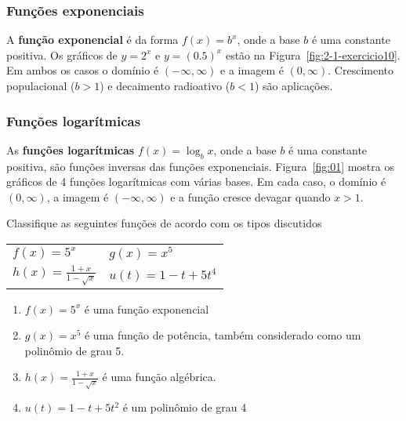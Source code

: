 \subsubsection{Funções exponenciais}

A \textbf{função exponencial} é da forma $f(x)=b^x$, onde a base $b$ é uma constante positiva. Os gráficos de $y=2^x$ e $y=(0.5)^x$ estão na Figura~\ref{fig:2-1-exercicio10}. Em ambos os casos o domínio é $(-\infty, \infty)$ e a imagem é $(0,\infty)$. Crescimento populacional ($b > 1$) e decaimento radioativo ($b < 1$) são aplicações.
\vspace{-0.5cm}\begin{figure}[!ht]
	\centering
	\caption{}\label{fig:exponential-functions}
\end{figure}\vspace{-0.5cm}
\subsubsection{Funções logarítmicas}

As \textbf{funções logarítmicas} $f(x)=\log_bx$, onde a base $b$ é uma constante positiva, são funções inversas das funções exponenciais. Figura~\ref{fig:01} mostra os gráficos de 4 funções logarítmicas com várias bases. Em cada caso, o domínio é $(0,\infty)$, a imagem é $(-\infty, \infty)$ e a função cresce devagar quando $x > 1$.

 Classifique as seguintes funções de acordo com os tipos discutidos
\begin{enumerate}[label=(\alph*)]
  \begin{tabular}{@{}m{}m{}@{}}
    \item $f(x) = 5^x$&
    \item $g(x) = x^5$\\
    \item $\displaystyle h(x) = \frac{1+x}{1-\sqrt{x}}$&
    \item $u(t) = 1-t+ 5t^4$
  \end{tabular}
\end{enumerate}

\solution
\begin{enumerate}[label=(\alph*)]
	\item $f(x)=5^x$ é uma função exponencial
	\item $g(x)=x^5$ é uma função de potência, também considerado como um polinômio de grau 5.
	\item $h(x) = \frac{1+x}{1-\sqrt{x}}$ é uma função algébrica.
	\item $u(t)= 1-t+5t^2$  é um polinômio de grau 4
\end{enumerate}


